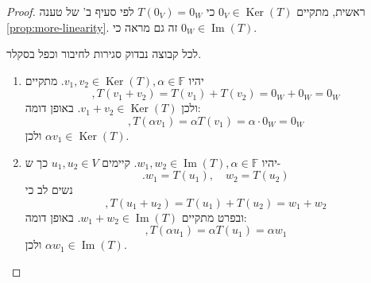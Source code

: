 \documentclass[12pt]{report}
\theoremstyle{plain}
\theoremstyle{definition}
\newcommand{\F}{\mathbb{F}}
\newcommand{\0}{\mathbf{0}}
\DeclareMathOperator{\Ker}{Ker}
\DeclareMathOperator{\Image}{Im}
\begin{document}
\begin{proof}
ראשית, מתקיים
$0_V\in\Ker(T)$
כי
$T(0_V)=0_W$
לפי סעיף ב' של טענה
\ref{prop:more-linearity}.
זה גם מראה כי 
$0_W\in\Image(T)$.

לכל קבוצה נבדוק סגירות לחיבור וכפל בסקלר.
\begin{enumerate}[label=\alph*.]
\item 
יהיו 
$v_1,v_2\in \Ker(T), \alpha\in\F$. 
מתקיים
$$
,T(v_1+v_2)=T(v_1)+T(v_2)=0_W+0_W=0_W
$$
ולכן
$v_1+v_2\in\Ker(T)$.
באופן דומה:
$$
,T(\alpha v_1)=\alpha T(v_1)=\alpha\cdot 0_W=0_W
$$
ולכן
$\alpha v_1\in\Ker(T)$.


\item
יהיו 
$w_1,w_2\in \Image(T), \alpha\in\F$. 
קיימים
$u_1,u_2\in V$
כך ש-
$$
.w_1=T(u_1),\quad w_2=T(u_2)
$$
נשים לב כי
$$
,T(u_1+u_2)=T(u_1)+T(u_2)=w_1+w_2
$$
ובפרט מתקיים
$w_1+w_2\in\Image(T)$.
באופן דומה:
$$
,T(\alpha u_1)=\alpha T(u_1)=\alpha w_1
$$
ולכן
$\alpha w_1\in\Image(T)$.


\end{enumerate}
\end{proof}
\end{document}
